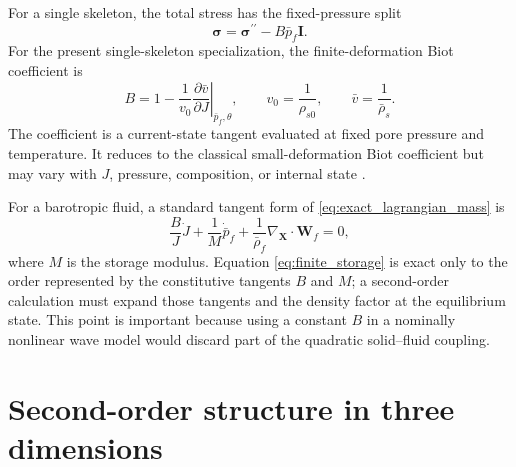 \documentclass[11pt]{article}
\newcommand{\mbf}[1]{\mathbf{#1}}
\newcommand{\bs}[1]{\boldsymbol{#1}}
\begin{document}
For a single skeleton, the total stress has the fixed-pressure split
\begin{equation}
    \bs\sigma
    =\bs\sigma^{\prime\prime}-B\bar p_f\mbf I.
    \label{eq:biot_stress_split}
\end{equation}
For the present single-skeleton specialization, the finite-deformation Biot
coefficient is
\begin{equation}
    B=1-\frac{1}{v_0}
    \left.
    \frac{\partial\bar v}{\partial J}
    \right|_{\bar p_f,\theta},
    \qquad
    v_0=\frac{1}{\rho_{s0}},
    \qquad
    \bar v=\frac{1}{\bar\rho_s}.
    \label{eq:nonlinear_biot_coefficient}
\end{equation}
The coefficient is a current-state tangent evaluated at fixed pore pressure
and temperature.  It reduces to the classical small-deformation Biot
coefficient but may vary with \(J\), pressure, composition, or internal state
\cite{fosterxu2025}.

For a barotropic fluid, a standard tangent form of
\eqref{eq:exact_lagrangian_mass} is
\begin{equation}
    \frac{B}{J}\dot J
    +\frac{1}{M}\dot{\bar p}_f
    +\frac{1}{\bar\rho_f}
    \nabla_{\mbf X}\cdot\mbf W_f=0,
    \label{eq:finite_storage}
\end{equation}
where \(M\) is the storage modulus.  Equation
\eqref{eq:finite_storage} is exact only to the order represented by the
constitutive tangents \(B\) and \(M\); a second-order calculation must expand
those tangents and the density factor at the equilibrium state.  This point is
important because using a constant \(B\) in a nominally nonlinear wave model
would discard part of the quadratic solid--fluid coupling.

\section{Second-order structure in three dimensions}
\end{document}
